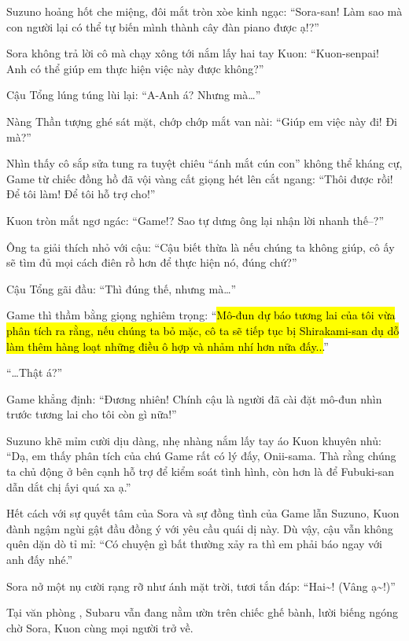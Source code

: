 \documentclass[../main.tex]{subfiles}
\begin{document}
Suzuno hoảng hốt che miệng, đôi mắt tròn xòe kinh ngạc: ``Sora-san! Làm sao mà con người lại có thể tự biến mình thành cây đàn piano được ạ!?''

Sora không trả lời cô mà chạy xông tới nắm lấy hai tay Kuon: ``Kuon-senpai! Anh có thể giúp em thực hiện việc này được không?''

Cậu Tổng lúng túng lùi lại: ``A-Anh á? Nhưng mà\dots''

Nàng Thần tượng ghé sát mặt, chớp chớp mắt van nài: ``Giúp em việc này đi! Đi mà?''

Nhìn thấy cô sắp sửa tung ra tuyệt chiêu ``ánh mắt cún con'' không thể kháng cự, Game từ chiếc đồng hồ đã vội vàng cất giọng hét lên cắt ngang: ``Thôi được rồi! Để tôi làm! Để tôi hỗ trợ cho!''

Kuon tròn mắt ngơ ngác: ``Game!? Sao tự dưng ông lại nhận lời nhanh thế--?''

Ông ta giải thích nhỏ với cậu: ``Cậu biết thừa là nếu chúng ta không giúp, cô ấy sẽ tìm đủ mọi cách điên rồ hơn để thực hiện nó, đúng chứ?''

Cậu Tổng gãi đầu: ``Thì đúng thế, nhưng mà\dots''

Game thì thầm bằng giọng nghiêm trọng: ``\hl{Mô-đun dự báo tương lai của tôi vừa phân tích ra rằng, nếu chúng ta bỏ mặc, cô ta sẽ tiếp tục bị Shirakami-san dụ dỗ làm thêm hàng loạt những điều ô hợp và nhảm nhí hơn nữa đấy...}''

``\dots Thật á?''

Game khẳng định: ``Đương nhiên! Chính cậu là người đã cài đặt mô-đun nhìn trước tương lai cho tôi còn gì nữa!''

Suzuno khẽ mỉm cười dịu dàng, nhẹ nhàng nắm lấy tay áo Kuon khuyên nhủ: ``Dạ, em thấy phân tích của chú Game rất có lý đấy, Onii-sama. Thà rằng chúng ta chủ động ở bên cạnh hỗ trợ để kiểm soát tình hình, còn hơn là để Fubuki-san dẫn dắt chị ấyi quá xa ạ.''

Hết cách với sự quyết tâm của Sora và sự đồng tình của Game lẫn Suzuno, Kuon đành ngậm ngùi gật đầu đồng ý với yêu cầu quái dị này. Dù vậy, cậu vẫn không quên dặn dò tỉ mỉ: ``Có chuyện gì bất thường xảy ra thì em phải báo ngay với anh đấy nhé.''

Sora nở một nụ cười rạng rỡ như ánh mặt trời, tươi tắn đáp: ``Hai\~{}! (Vâng ạ\~{}!)''

\ct

Tại văn phòng \hll, Subaru vẫn đang nằm ườn trên chiếc ghế bành, lười biếng ngóng chờ Sora, Kuon cùng mọi người trở về.
\end{document}
